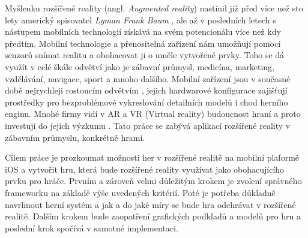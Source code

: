 \documentclass[twoside,12pt]{article}
\begin{document}
\def\,{\penalty10000\hskip.25em}
\pagestyle{headings}

\bakalarska





 
\newpage\null\thispagestyle{empty}\newpage




\obsah


%
%

% 
Myšlenku rozšířené reality (angl. \textit{Augmented reality}) nastínil již před více než sto lety americký spisovatel \textit{Lyman Frank Baum} \cite{baum}, ale až v posledních letech s nástupem mobilních technologií získává na svém potencionálu více než kdy předtím. Mobilní technologie a přenositelná zařízení nám umožňují pomocí senzorů snímat realitu a obohacovat ji o uměle vytvořené prvky. Toho se dá využít v celé škále odvětví jako je zábavní průmysl, medicína, marketing, vzdělávání, navigace, sport a mnoho dalšího. Mobilní zařízení jsou v současné době nejrychleji rostoucím odvětvím \cite{mobile_economy}, jejich hardwarové konfigurace zajišťují prostředky pro bezproblémové vykreslování detailních modelů i chod herního enginu. Mnohé firmy vidí v AR a VR (Virtual reality) budoucnost hraní a proto investují do jejich výzkumu \cite{guardian_samsung}. Tato práce se zabývá aplikací rozšířené reality v zábavním průmyslu, konkrétně hrami. 

% 
Cílem práce je prozkoumat možnosti her v rozšířené realitě na mobilní plaformě iOS a vytvořit hru, která bude rozšířené reality využívat jako obohacujícího prvku pro hráče. Prvním a zároveň velmi důležitým krokem je zvolení správného frameworku na základě výše uvedených kritérií. Poté je potřeba důkladně navrhnout herní systém a jak a do jaké míry se bude hra odehrávat v rozšířené realitě. Dalším krokem bude zaopatření grafických podkladů a modelů pro hru a poslední krok spočívá v samotné implementaci.
\end{document}
